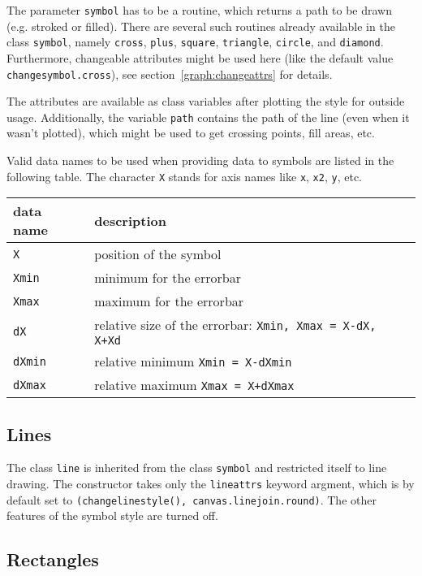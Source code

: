 The parameter \verb|symbol| has to be a routine, which returns a path to
be drawn (e.g. stroked or filled). There are several such routines
already available in the class \verb|symbol|, namely \verb|cross|,
\verb|plus|, \verb|square|, \verb|triangle|, \verb|circle|, and
\verb|diamond|. Furthermore, changeable attributes might be used here
(like the default value \verb|changesymbol.cross|), see
section~\ref{graph:changeattrs} for details.

The attributes are available as class variables after plotting the
style for outside usage. Additionally, the variable \verb|path|
contains the path of the line (even when it wasn't plotted), which
might be used to get crossing points, fill areas, etc.

Valid data names to be used when providing data to symbols are listed
in the following table. The character \verb|X| stands for axis names
like \verb|x|, \verb|x2|, \verb|y|, etc.

\begin{center}
\begin{tabular}{ll}
data name&description\\
\hline
\texttt{X}&position of the symbol\\
\texttt{Xmin}&minimum for the errorbar\\
\texttt{Xmax}&maximum for the errorbar\\
\texttt{dX}&relative size of the errorbar: \texttt{Xmin, Xmax = X-dX, X+Xd}\\
\texttt{dXmin}&relative minimum \texttt{Xmin = X-dXmin}\\
\texttt{dXmax}&relative maximum \texttt{Xmax = X+dXmax}\\
\end{tabular}
\end{center}

\subsection{Lines}

The class \verb|line| is inherited from the class \verb|symbol| and
restricted itself to line drawing. The constructor takes only the
\verb|lineattrs| keyword argment, which is by default set to
\verb|(changelinestyle(), canvas.linejoin.round)|. The other features
of the symbol style are turned off.

\subsection{Rectangles}


